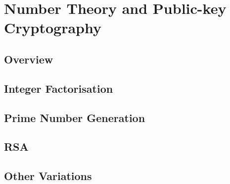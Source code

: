 
\chapter{Number Theory and Public-key Cryptography}
\label{Chapter3}

\section{Overview}
\section{Integer Factorisation}
\section{Prime Number Generation}
\section{RSA}
\section{Other Variations}